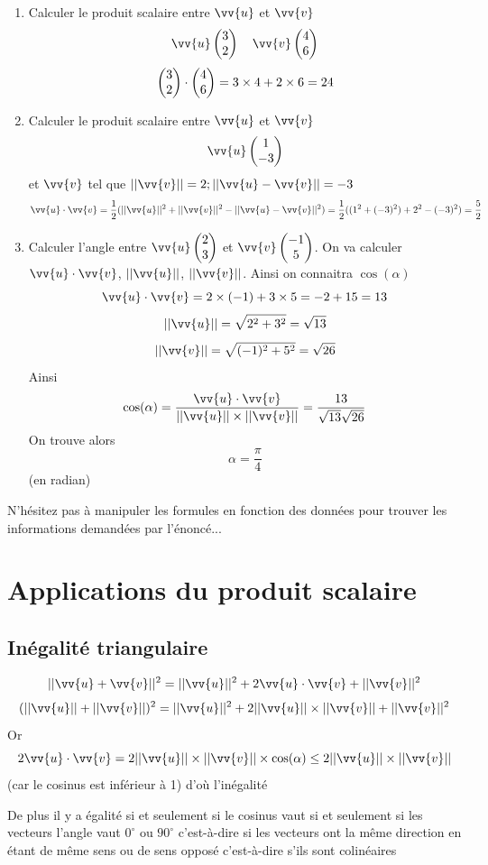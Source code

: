 \begin{exemples}
\begin{enumerate}
\item Calculer le produit scalaire entre $\vv{u}$ et $\vv{v}$ $$\vv{u} \covec{3}{2} \quad \vv{v} \covec{4}{6}$$
$$\begin{pmatrix}3 \\2 \end{pmatrix}\cdot \begin{pmatrix}4 \\6 \end{pmatrix} = 3\times4+2\times6 =24$$
\item Calculer le produit scalaire entre $\vv{u}$ et $\vv{v}$ $$\vv{u} \covec{1}{-3}$$ et $\vv{v}$ tel que $||\vv{v}|| = 2;||\vv{u}-\vv{v}|| = -3$
$$\vv{u}\cdot\vv{v} = \dfrac{1}{2}(||\vv{u}||^2 + ||\vv{v}||^2 - ||\vv{u} - \vv{v}||^2) = \dfrac{1}{2}((1^2 + (-3)^2) + 2^2 - (-3)^2) = \dfrac{5}{2}$$
\item Calculer l'angle entre $\vv{u} \covec{2}{3}$ et $\vv{v} \covec{-1}{5}$. On va calculer $\vv{u} \cdot \vv{v}$, $||\vv{u}||$, $||\vv{v}||$. Ainsi on connaitra $\cos(\alpha)$
$$\vv{u}\cdot\vv{v} = 2\times(-1) + 3\times 5 = -2 +15 = 13$$
$$||\vv{u}|| = \sqrt{2^2+3^2} = \sqrt{13}$$
$$||\vv{v}|| = \sqrt{(-1)^2 + 5^2} = \sqrt{26}$$
Ainsi 
$$\cos(\alpha) = \dfrac{\vv{u}\cdot\vv{v}}{||\vv{u}||\times||\vv{v}||} = \dfrac{13}{\sqrt{13}\sqrt{26}}$$
On trouve alors 
$$\alpha = \dfrac{\pi}{4}$$ (en radian)
\end{enumerate}
\end{exemples}
\begin{remarque}
N'hésitez pas à manipuler les formules en fonction des données pour trouver les informations demandées par l'énoncé...
\end{remarque}
\section{Applications du produit scalaire}
\subsection{Inégalité triangulaire}
\newline

\begin{preuve}
$$ ||\vv{u} + \vv{v}||^2 = ||\vv{u}||^2 + 2\vv{u}\cdot\vv{v} + ||\vv{v}||^2$$ 
$$(||\vv{u}|| + ||\vv{v}||)^2 = ||\vv{u}||^2 + 2||\vv{u}||\times||\vv{v}|| + ||\vv{v}||^2$$
Or 
$$2\vv{u}\cdot\vv{v} = 2||\vv{u}||\times||\vv{v}||\times \cos(\alpha) \leq 2||\vv{u}||\times||\vv{v}||$$ (car le cosinus est inférieur à 1)
d'où l'inégalité\newline

De plus il y a égalité si et seulement si le cosinus vaut si et seulement si les vecteurs l'angle vaut $0^{\circ}$ ou $90^{\circ}$ c'est-à-dire si les vecteurs ont la même direction en étant de même sens ou de sens opposé c'est-à-dire s'ils sont colinéaires
\end{preuve}

